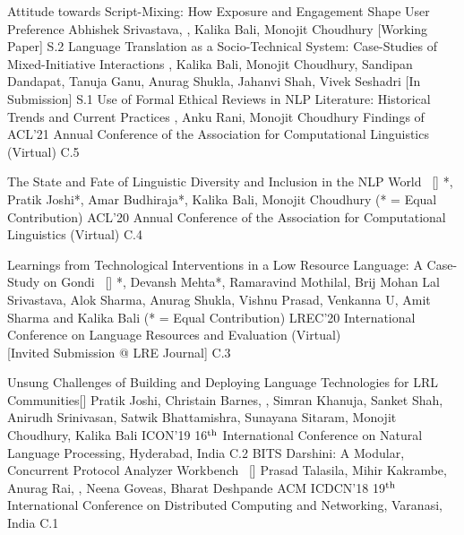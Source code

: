 
\begin{publications}
\publication
    {Attitude towards Script-Mixing: How Exposure and Engagement Shape User Preference}{}
    {Abhishek Srivastava, \underline{}, Kalika Bali, Monojit Choudhury}
	{} {[Working Paper]} {S.2}
\publication
    {Language Translation as a Socio-Technical System: Case-Studies of Mixed-Initiative Interactions}{}
    {\underline{}, Kalika Bali, Monojit Choudhury, Sandipan Dandapat, Tanuja Ganu, Anurag Shukla, Jahanvi Shah, Vivek Seshadri}
	{} {[In Submission]} {S.1}
\publication
    {Use of Formal Ethical Reviews in NLP Literature: Historical Trends and Current Practices}{}
    {\underline{}, Anku Rani, Monojit Choudhury}
	{Findings of ACL'21} {Annual Conference of the Association for Computational Linguistics (Virtual)} {C.5}
	
\publication
    {The State and Fate of Linguistic Diversity and Inclusion in the NLP World}{~ [\href{https://www.aclweb.org/anthology/2020.acl-main.560/}{\small{\linkSymbol}}]}
    {\underline{}*, Pratik Joshi*, Amar Budhiraja*, Kalika Bali, Monojit Choudhury \small{(* = Equal Contribution)}}
	{ACL'20} {Annual Conference of the Association for Computational Linguistics (Virtual)} {C.4}

\publication
    {Learnings from Technological Interventions in a Low Resource Language: A Case-Study on Gondi}{~ [\href{https://www.aclweb.org/anthology/2020.lrec-1.345/}{\small{\linkSymbol}}]}
    {\underline{}*, Devansh Mehta*, Ramaravind Mothilal, Brij Mohan Lal Srivastava, Alok Sharma, Anurag Shukla, Vishnu Prasad, Venkanna U, Amit Sharma and Kalika Bali \small{(* = Equal Contribution)}}
	{LREC'20} {International Conference on Language Resources and Evaluation (Virtual) \\ {{[Invited Submission @ LRE Journal]}}} {C.3}

\publication 
    {Unsung Challenges of Building and Deploying Language Technologies for LRL Communities}{[\href{https://arxiv.org/abs/1912.03457}{\small{\linkSymbol}}]}
    {Pratik Joshi, Christain Barnes, \underline{}, Simran Khanuja, Sanket Shah, Anirudh Srinivasan, Satwik Bhattamishra, Sunayana Sitaram, Monojit Choudhury, Kalika Bali}
	{ICON'19} {16$^{\textrm{\scriptsize th}}$ International Conference on Natural Language Processing, Hyderabad, India} {C.2}
\publication
	{BITS Darshini: A Modular, Concurrent Protocol Analyzer Workbench}{~ [\href{https://dl.acm.org/doi/10.1145/3154273.3154316}{\small{\linkSymbol}}]}
	{Prasad Talasila, Mihir Kakrambe, Anurag Rai, \underline{}, Neena Goveas, Bharat Deshpande}
	{ACM ICDCN'18} {19$^{\textrm{\scriptsize th}}$ International Conference on Distributed Computing and Networking, Varanasi, India} {C.1}

\end{publications}
